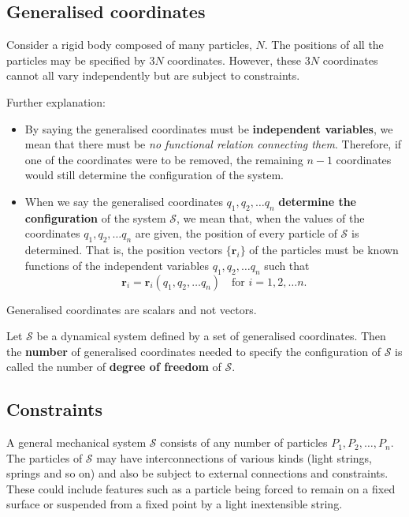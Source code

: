 \documentclass[12pt, a4paper]{article}
\begin{document}
\subsection{Generalised coordinates}

Consider a rigid body composed of many particles, \(N\). The positions of all the particles may be specified by \(3N\) coordinates. However, these \(3N\) coordinates cannot all vary independently but are subject to constraints.

\begin{mdremark}
    Further explanation:
    \begin{itemize}
        \item By saying the generalised coordinates must be \textbf{independent variables}, we mean that there must be \textit{no functional relation connecting them}. Therefore, if one of the coordinates were to be removed, the remaining \(n-1\) coordinates would still determine the configuration of the system.
        \item When we say the generalised coordinates \(q_1,q_2,\ldots q_n\) \textbf{determine the configuration} of the system \(\mathcal S\), we mean that, when the values of the coordinates \(q_1,q_2,\ldots q_n\) are given, the position of every particle of \(\mathcal S\) is determined. That is, the position vectors \(\{\bm{r}_i\}\) of the particles must be known functions of the independent variables \(q_1,q_2,\ldots q_n\) such that
        \[\bm{r}_i=\bm{r}_i(q_1,q_2,\ldots q_n) \quad \text{for } i=1,2,\ldots n.\]
    \end{itemize}
\end{mdremark}

\begin{mdremark}
    Generalised coordinates are scalars and not vectors.
\end{mdremark}

\begin{definition}
    Let \(\mathcal S\) be a dynamical system defined by a set of generalised coordinates. Then the \textbf{number} of generalised coordinates needed to specify the configuration of \(\mathcal S\) is called the number of \textbf{degree of freedom} of \(\mathcal S\).
\end{definition}

\subsection{Constraints}

A general mechanical system \(\mathcal{S}\) consists of any number of particles \(P_1,P_2, \ldots, P_n\). The particles of \(\mathcal{S}\) may have interconnections of various kinds (light strings, springs and so on) and also be subject to external connections and constraints. These could include features such as a particle being forced to remain on a fixed surface or suspended from a fixed point by a light inextensible string.
\end{document}
